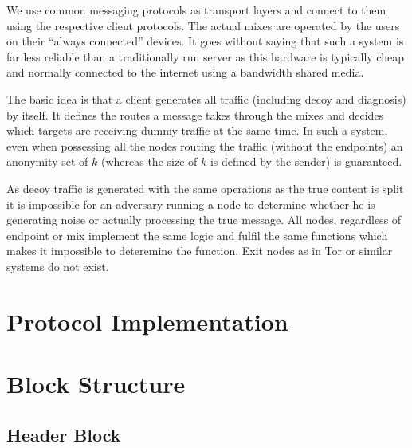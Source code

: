 We use common messaging protocols as transport layers and connect to them using the respective client protocols. The actual mixes are operated by the users on their ``always connected'' devices. It goes without saying that such a system is far less reliable than a traditionally run server as this hardware is typically cheap and normally connected to the internet using a bandwidth shared media.

The basic idea is that a client generates all traffic (including decoy and diagnosis) by itself. It defines the routes a message takes through the mixes and decides which targets are receiving dummy traffic at the same time. In such a system, even when possessing all the nodes routing the traffic (without the endpoints) an anonymity set of $k$ (whereas the size of $k$ is defined by the sender) is guaranteed.

As decoy traffic is generated with the same operations as the true content is split it is impossible for an adversary running a node to determine whether he is generating noise or actually processing the true message.
All nodes, regardless of endpoint or mix implement the same logic and fulfil the same functions which makes it impossible to deteremine the function. Exit nodes as in Tor or similar systems do not exist.


%
\section{Protocol Implementation\label{protoImpl}}

\section{Block Structure}
% 

\subsection{Header Block}


